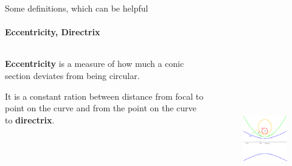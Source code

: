 \documentclass[aspectratio=169]{beamer}
\begin{document}
\begin{frame}[t]{Some definitions, which can be helpful}
\framesubtitle{Eccentricity, Directrix}
    \begin{columns}[T,onlytextwidth]
        \begin{column}{0.59\textwidth}
            \textbf{Eccentricity} is a measure of how much a conic section deviates from being circular. \medskip
        
            It is a constant ration between distance from focal to point on the curve and from the point on the curve to \textbf{directrix}.
        \end{column}
        \begin{column}{0.39\textwidth}
            \vspace{-1cm}
            \begin{figure}[H]
                    \centering\includegraphics[height=7cm,width=1\textwidth,keepaspectratio]{eccentricity.png}
                    \label{fig:eccentricity.png}
            \end{figure}
        \end{column}
    \end{columns}
\end{frame}
\end{document}
